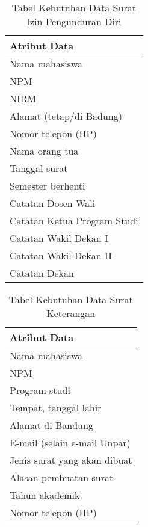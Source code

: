 \begin{table}[H]
\centering
\caption{Tabel Kebutuhan Data Surat Izin Pengunduran Diri}
\label{surat_izin_pengunduran_diri}
\begin{tabular}{|l|}
\hline
{\textbf{Atribut Data}}                     \\ \hline
{Nama mahasiswa}                            \\ \hline 
{NPM}                                       \\ \hline 
{NIRM}                                      \\ \hline 
{Alamat (tetap/di Badung)}                  \\ \hline 
{Nomor telepon (HP)}                        \\ \hline 
{Nama orang tua}                            \\ \hline 
{Tanggal surat}                             \\ \hline 
{Semester berhenti}                         \\ \hline 
{Catatan Dosen Wali}                        \\ \hline 
{Catatan Ketua Program Studi}               \\ \hline 
{Catatan Wakil Dekan I}                     \\ \hline 
{Catatan Wakil Dekan II}                    \\ \hline 
{Catatan Dekan}                             \\ \hline
\end{tabular}
\end{table}

\begin{table}[H]
\centering
\caption{Tabel Kebutuhan Data Surat Keterangan}
\label{surat_keterangan}
\begin{tabular}{|l|}
\hline
{\textbf{Atribut Data}}                     \\ \hline
{Nama mahasiswa}                            \\ \hline 
{NPM}                                       \\ \hline 
{Program studi}                             \\ \hline 
{Tempat, tanggal lahir}                     \\ \hline 
{Alamat di Bandung}                         \\ \hline 
{E-mail (selain e-mail Unpar)}               \\ \hline 
{Jenis surat yang akan dibuat}              \\ \hline 
{Alasan pembuatan surat}                    \\ \hline 
{Tahun akademik}                            \\ \hline 
{Nomor telepon (HP)}                        \\ \hline

\end{tabular}
\end{table}

